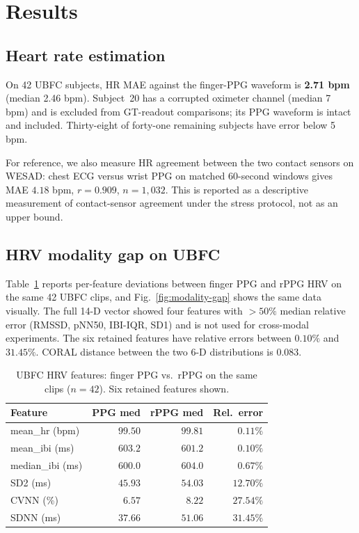 \documentclass[conference]{IEEEtran}
\begin{document}
\section{Results}

\subsection{Heart rate estimation}
On 42 UBFC subjects, HR MAE against the finger-PPG waveform is
\textbf{2.71 bpm} (median 2.46 bpm). Subject~20 has a corrupted
oximeter channel (median 7 bpm) and is excluded from GT-readout
comparisons; its PPG waveform is intact and included. Thirty-eight of
forty-one remaining subjects have error below 5 bpm.

For reference, we also measure HR agreement between the two contact
sensors on WESAD: chest ECG versus wrist PPG on matched 60-second
windows gives MAE $4.18$ bpm, $r{=}0.909$, $n{=}1{,}032$. This is
reported as a descriptive measurement of contact-sensor agreement
under the stress protocol, not as an upper bound.

\subsection{HRV modality gap on UBFC}
Table~\ref{tab:modality-gap} reports per-feature deviations between
finger PPG and rPPG HRV on the same 42 UBFC clips, and
Fig.~\ref{fig:modality-gap} shows the same data visually. The full
14-D vector showed four features with $>50\%$ median relative error
(RMSSD, pNN50, IBI-IQR, SD1) and is not used for cross-modal
experiments. The six retained features have relative errors between
$0.10\%$ and $31.45\%$. CORAL distance between the two 6-D
distributions is $0.083$.

\begin{table}[t]
\caption{UBFC HRV features: finger PPG vs.\ rPPG on the same clips
($n{=}42$). Six retained features shown.}
\label{tab:modality-gap}
\centering
\small
\begin{tabular}{lrrr}
\toprule
Feature & PPG med & rPPG med & Rel.\ error \\
\midrule
mean\_hr (bpm)   & $99.50$ & $99.81$ & $0.11\%$ \\
mean\_ibi (ms)   & $603.2$ & $601.2$ & $0.10\%$ \\
median\_ibi (ms) & $600.0$ & $604.0$ & $0.67\%$ \\
SD2 (ms)         & $45.93$ & $54.03$ & $12.70\%$ \\
CVNN (\%)        & $6.57$  & $8.22$  & $27.54\%$ \\
SDNN (ms)        & $37.66$ & $51.06$ & $31.45\%$ \\
\bottomrule
\end{tabular}
\end{table}
\end{document}
